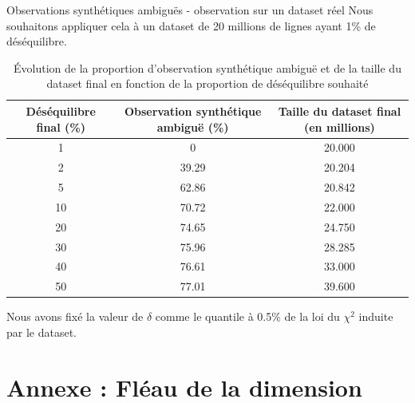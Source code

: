 \documentclass{beamer}
\begin{document}
\begin{frame}{}{Observations synthétiques ambiguës - observation sur un dataset réel}
	Nous souhaitons appliquer cela à un dataset de 20 millions de lignes ayant 1\% de déséquilibre. \newline
	
	\begin{table}
		\centering
		\begin{tabular}{@{}ccc@{}}\toprule
			Déséquilibre final (\%) & Observation synthétique ambiguë (\%) & Taille du dataset final (en millions)\\ \midrule
			1 & 0 & 20.000\\
			2 & 39.29 & 20.204\\
			5 & 62.86 & 20.842\\
			10 & 70.72 & 22.000\\
			20 & 74.65 & 24.750\\
			30 & 75.96 & 28.285\\
			40 & 76.61 & 33.000\\
			50 & 77.01 & 39.600\\ \bottomrule
		\end{tabular}
		\caption{Évolution de la proportion d'observation synthétique ambiguë et de la taille du dataset final en fonction de la proportion de déséquilibre souhaité}
	\end{table}
	
	Nous avons fixé la valeur de $\delta$ comme le quantile à 0.5\% de la loi du $\chi^2$ induite par le dataset.
\end{frame}


\section{Annexe : Fléau de la dimension}
\end{document}
